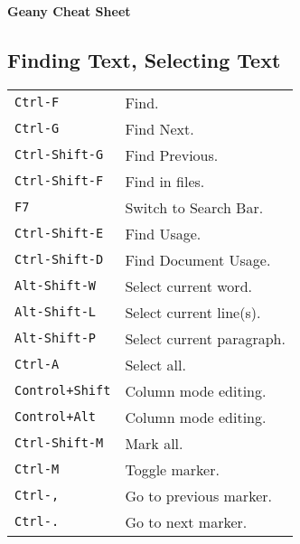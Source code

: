 




\raggedright
\footnotesize

\begin{center}
	\Huge{\textbf{Geany Cheat Sheet}} \\
\end{center}
\vspace*{0.5cm}

\begin{multicols}{3}


\setlength{\premulticols}{1pt}
\setlength{\postmulticols}{1pt}
\setlength{\multicolsep}{1pt}
\setlength{\columnsep}{2pt}


\section{Finding Text, Selecting Text}
\begin{tabular}{@{}ll@{}}
	\verb!Ctrl-F! & Find. \\
	\verb!Ctrl-G! & Find Next. \\
	\verb!Ctrl-Shift-G! & Find Previous. \\
	\verb!Ctrl-Shift-F! & Find in files. \\
	\verb!F7! & Switch to Search Bar. \\
	\verb!Ctrl-Shift-E! & Find Usage. \\
	\verb!Ctrl-Shift-D! & Find Document Usage. \\
	\verb!Alt-Shift-W! & Select current word. \\
	\verb!Alt-Shift-L! & Select current line(s). \\
	\verb!Alt-Shift-P! & Select current paragraph. \\
	\verb!Ctrl-A! & Select all. \\
	\verb!Control+Shift! & Column mode editing. \\
	\verb!Control+Alt! & Column mode editing. \\
	\verb!Ctrl-Shift-M! & Mark all. \\
	\verb!Ctrl-M! & Toggle marker. \\
	\verb!Ctrl-,! & Go to previous marker. \\
	\verb!Ctrl-.! & Go to next marker. \\
\end{tabular}


\end{multicols}
